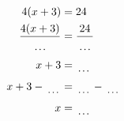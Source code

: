 \documentclass[varwidth]{standalone}
\begin{document}
    \begin{varwidth}{0.25\paperwidth}
    \begin{align*}
    4(x + 3) &= 24\\
    \frac{4(x+3)}{\dotuline{\hspace{5mm}}} &= \frac{24}{\dotuline{\hspace{5mm}}}\\
    x + 3 &= \dotuline{\hspace{5mm}}\\
    x + 3 - \dotuline{\hspace{5mm}} &= \dotuline{\hspace{5mm}} - \dotuline{\hspace{5mm}}\\
    x &= \dotuline{\hspace{5mm}}\\
\end{align*}
\end{varwidth}
\end{document}
